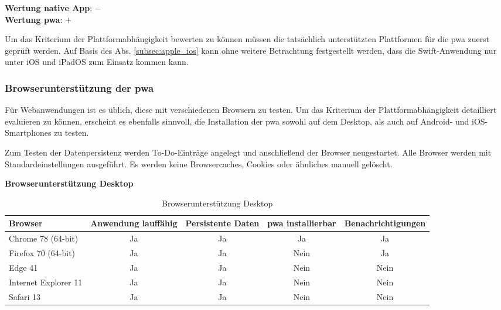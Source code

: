 \textbf{Wertung native App}: $-$ \\
\textbf{Wertung \ac{pwa}}: $+$


Um das Kriterium der Plattformabhängigkeit bewerten zu können müssen die tatsächlich unterstützten Plattformen für die \ac{pwa} zuerst geprüft werden. Auf Basis des Abs. \ref{subsec:apple_ios} kann ohne weitere Betrachtung festgestellt werden, dass die Swift-Anwendung nur unter iOS und iPadOS zum Einsatz kommen kann.

\subsubsection{Browserunterstützung der \acs{pwa}}
Für Webanwendungen ist es üblich, diese mit verschiedenen Browsern zu testen. Um das Kriterium der Plattformabhängigkeit detailliert evaluieren zu können, erscheint es ebenfalls sinnvoll, die Installation der \ac{pwa} sowohl auf dem Desktop, als auch auf Android- und iOS-Smartphones zu testen.

Zum Testen der Datenpersistenz werden To-Do-Einträge angelegt und anschließend der Browser neugestartet.
Alle Browser werden mit Standardeinstellungen ausgeführt. Es werden keine Browsercaches, Cookies oder ähnliches manuell gelöscht.

\textbf{Browserunterstützung Desktop} 

\begin{table}[h!]
	\centering
	\begin{tabularx}{\textwidth}{|l||C|C|C|c|}
		\hline
		Browser              & Anwendung lauffähig & Persistente Daten & \ac{pwa} installierbar & Benachrichtigungen \\
		\hline
		Chrome 78 (64-bit)   & Ja                  & Ja                & Ja                & Ja                 \\
		Firefox 70 (64-bit)  & Ja                  & Ja                & Nein              & Ja                 \\
		Edge 41    & Ja                  & Ja                & Nein              & Nein               \\
		Internet Explorer 11 & Ja                  & Ja                & Nein              & Nein               \\
		Safari 13            & Ja                  & Ja                & Nein              & Nein               \\
		\hline
	\end{tabularx}
	\caption{Browserunterstützung Desktop} \label{tab:browser_desktop}
\end{table}

